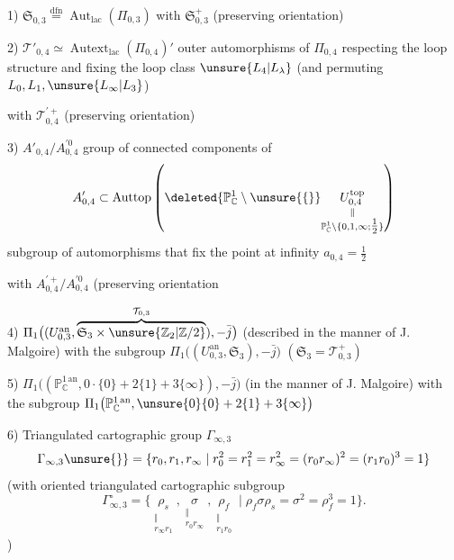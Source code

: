 1) $\mathfrak S_{0,3}\overset{\text{dfn}}{=}\operatorname{Aut}_{\mathrm{lac}}(\Pi_{0,3})$
with  $\mathfrak S_{0,3}^{+}$ (preserving orientation)

2) $\mathcal{T}'_{0,4}\simeq\operatorname{Autext}_{\mathrm{lac}}(\Pi_{0,4})'$
outer automorphisms of $\Pi_{0,4}$ respecting the loop structure and fixing the loop class
$\unsure{L_4|L_\lambda}$ (and permuting $L_0,L_1,\unsure{L_\infty|L_3}$)

with $\mathcal{T}_{0,4}^{\prime+}$ (preserving orientation)

3) $A'_{0,4}/A_{0,4}^{\prime0}$ group of connected components of
\[
A'_{0,4}\subset\operatorname{Auttop}
\left(\deleted{\mathbb P^1_{\mathbb C}\setminus\unsure{\{}}
\underset{\substack{\Vert\\\mathbb P^1_{\mathbb C}\setminus\{0,1,\infty;\tfrac12\}}}{U_{0,4}^{\mathrm{top}}}\right)
\]
subgroup of automorphisms that fix the point at infinity $a_{0,4}=\tfrac12$

with $A_{0,4}^{\prime+}/A_{0,4}^{\prime0}$ (preserving orientation

4) $\Pi_1\bigl((U_{0,3}^{\mathrm{an}},\overbrace{\mathfrak S_3\times\unsure{\mathbb Z_2|\mathbb Z/2}}^{\mathcal{T}_{0,3}}),-\bar j\bigr)$
(described in the manner of J. Malgoire)
with the subgroup $\Pi_1\bigl((U_{0,3}^{\mathrm{an}},\mathfrak S_3),-\bar j\bigr)$
$(\mathfrak S_3=\mathcal{T}_{0,3}^{+})$

5) $\Pi_1\bigl((\mathbb P^{1\,\mathrm{an}}_{\mathbb C},0\cdot\{0\}+2\{1\}+3\{\infty\}),-\bar j\bigr)$
(in the manner of J. Malgoire)
with the subgroup $\Pi_1\bigl(\mathbb P^{1\,\mathrm{an}}_{\mathbb C},\unsure{0}\{0\}+2\{1\}+3\{\infty\}\bigr)$

6) Triangulated cartographic group  $\Gamma_{\infty,3}$
\[
\Gamma_{\infty,3}\unsure{\}}=\{r_0,r_1,r_\infty\mid
r_0^2=r_1^2=r_\infty^2=(r_0r_\infty)^2=(r_1r_0)^3=1\}
\]
(with oriented triangulated cartographic subgroup
\[
\Gamma_{\infty,3}^{\circ}=\{
\underset{\substack{\Vert\\r_\infty r_1}}{\rho_s},
\underset{\substack{\Vert\\r_0r_\infty}}{\sigma},
\underset{\substack{\Vert\\r_1r_0}}{\rho_f}
\mid\rho_f\sigma\rho_s=\sigma^2=\rho_f^3=1\}.
\]
)


